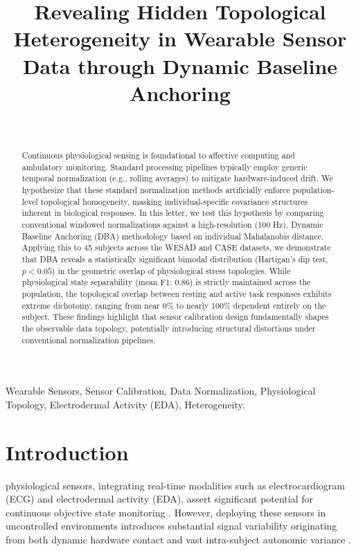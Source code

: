 \documentclass{IEEE_lsens}
\begin{document}
\title{Revealing Hidden Topological Heterogeneity in Wearable Sensor Data through Dynamic Baseline Anchoring}

\author{
    \\
}

\maketitle

\begin{abstract}
Continuous physiological sensing is foundational to affective computing and ambulatory monitoring. Standard processing pipelines typically employ generic temporal normalization (e.g., rolling averages) to mitigate hardware-induced drift. We hypothesize that these standard normalization methods artificially enforce population-level topological homogeneity, masking individual-specific covariance structures inherent in biological responses. In this letter, we test this hypothesis by comparing conventional windowed normalizations against a high-resolution (100 Hz), Dynamic Baseline Anchoring (DBA) methodology based on individual Mahalanobis distance. Applying this to 45 subjects across the WESAD and CASE datasets, we demonstrate that DBA reveals a statistically significant bimodal distribution (Hartigan's dip test, $p < 0.05$) in the geometric overlap of physiological stress topologies. While physiological state separability (mean F1: 0.86) is strictly maintained across the population, the topological overlap between resting and active task responses exhibits extreme dichotomy, ranging from near 0\% to nearly 100\% dependent entirely on the subject. These findings highlight that sensor calibration design fundamentally shapes the observable data topology, potentially introducing structural distortions under conventional normalization pipelines.
\end{abstract}

\begin{IEEEkeywords}
Wearable Sensors, Sensor Calibration, Data Normalization, Physiological Topology, Electrodermal Activity (EDA), Heterogeneity.
\end{IEEEkeywords}

\section{Introduction}
 physiological sensors, integrating real-time modalities such as electrocardiogram (ECG) and electrodermal activity (EDA), assert significant potential for continuous objective state monitoring \cite{picard1997}. However, deploying these sensors in uncontrolled environments introduces substantial signal variability originating from both dynamic hardware contact and vast intra-subject autonomic variance \cite{wilhelm2006}. 
\end{document}
